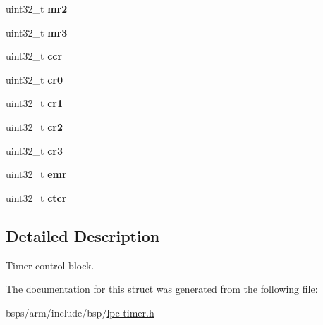 \begin{DoxyCompactItemize}
uint32\+\_\+t {\bfseries mr2}
\item 
\mbox{\label{structlpc__timer_a7c8a41aff4105912dae7832e2a0677a4}} 
uint32\+\_\+t {\bfseries mr3}
\item 
\mbox{\label{structlpc__timer_a0a39f7cd4c0b2992d78afd0fd9d56901}} 
uint32\+\_\+t {\bfseries ccr}
\item 
\mbox{\label{structlpc__timer_ab034458afbb39f9f3f00263a41512e1f}} 
uint32\+\_\+t {\bfseries cr0}
\item 
\mbox{\label{structlpc__timer_a292f78104a524c3b30b7a2d41e079c39}} 
uint32\+\_\+t {\bfseries cr1}
\item 
\mbox{\label{structlpc__timer_a2cc332b72f55c63f56636983c4b4851b}} 
uint32\+\_\+t {\bfseries cr2}
\item 
\mbox{\label{structlpc__timer_a7096af1b35a67345fc4469d1ba7872a6}} 
uint32\+\_\+t {\bfseries cr3}
\item 
\mbox{\label{structlpc__timer_a32ed004a392afcc8b5077775d8f768b2}} 
uint32\+\_\+t {\bfseries emr}
\item 
\mbox{\label{structlpc__timer_a743d4eca0c82e956e1bcf5279374fab5}} 
uint32\+\_\+t {\bfseries ctcr}
\end{DoxyCompactItemize}


\subsection{Detailed Description}
Timer control block. 

The documentation for this struct was generated from the following file\+:\begin{DoxyCompactItemize}
\item 
bsps/arm/include/bsp/\mbox{\hyperlink{lpc-timer_8h}{lpc-\/timer.\+h}}\end{DoxyCompactItemize}
